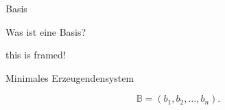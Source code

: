 \documentclass[class=article, crop=false]{standalone}
\begin{document}
\begin{zettel}{Basis}
\begin{flashcard}
\begin{question}
Was ist eine Basis?
\end{question}

\begin{mdframed}
    this is framed!
\end{mdframed}
    Minimales Erzeugendensystem
    
\[
    \mathbb{B} = (b_1 , b_2 , \dots , b_n )
.\]
\end{flashcard}
\end{zettel}
\end{document}
